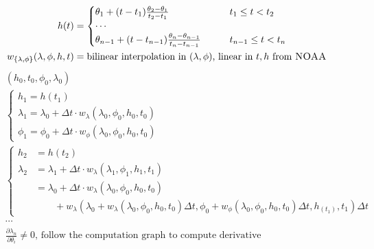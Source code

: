 \documentclass[10pt,mathserif]{beamer}
\begin{document}
\begin{frame}
\begin{align*}
h(t) &= \begin{cases}
\theta_1 + (t-t_1)\frac{\theta_2-\theta_1}{t_2-t_1} \qquad & t_1 \leq t < t_2\\
\cdots\\
\theta_{n-1} + (t-t_{n-1})\frac{\theta_n-\theta_{n-1}}{t_n-t_{n-1}} \qquad & t_{n-1} \leq t < t_n
\end{cases}\\
w_{\{\lambda,\phi\}}(\lambda,\phi,h,t) &= \text{bilinear interpolation in $(\lambda,\phi)$, linear in $t,h$ from \textsc{NOAA}}
\end{align*}
\begin{align*}
&(h_0, t_0, \phi_0, \lambda_0)\\
&\begin{cases}
h_1 = h(t_1)\\
\lambda_1 = \lambda_0 + \Delta t \cdot w_\lambda(\lambda_0, \phi_0, h_0, t_0)\\
\phi_1 = \phi_0 + \Delta t \cdot w_\phi(\lambda_0, \phi_0, h_0, t_0)
\end{cases}\\
&\begin{cases}
h_2 &= h(t_2)\\
\lambda_2 &= \lambda_1 + \Delta t \cdot w_\lambda(\lambda_1, \phi_1, h_1, t_1)\\
&{\scriptstyle =\lambda_0 + \Delta t \cdot w_\lambda(\lambda_0, \phi_0, h_0, t_0)} \\[-0.2cm]
&{\scriptstyle \qquad + w_\lambda(\lambda_0 + w_\lambda(\lambda_0, \phi_0, h_0, t_0) \Delta t, \phi_0 +  w_\phi(\lambda_0, \phi_0, h_0, t_0)\Delta t, h_(t_1), t_1)\Delta t} 
\end{cases}\\
&\cdots\\
&\frac{\partial \lambda_n}{\partial \theta_i}\neq 0\text{, follow the computation graph to compute derivative}
\end{align*}

\end{frame}
\end{document}
